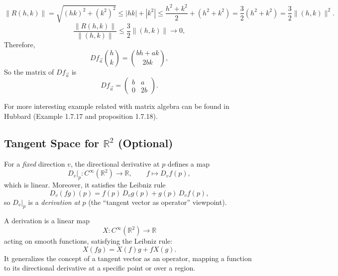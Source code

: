 \[
\|R(h,k)\|=\sqrt{(hk)^2+(k^2)^2}\le |hk|+|k^2|
\le \frac{h^2+k^2}{2}+(h^2+k^2)=\frac{3}{2}(h^2+k^2)=\frac{3}{2}\|(h,k)\|^2.
\]
\[
\frac{\|R(h,k)\|}{\|(h,k)\|}\le \frac{3}{2}\|(h,k)\|\to 0,
\]
Therefore,
\[
Df_{\vec a}\binom{h}{k}=\binom{bh+ak}{2bk},
\]
So the matrix of $Df_{\vec a}$ is
\[
Df_{\vec a}=
\begin{pmatrix}
b & a\\
0 & 2b
\end{pmatrix}.
\]
\begin{remark}
  For more interesting example related with matrix algebra can be found in Hubbard \cite{hubbard} (Example 1.7.17 and proposition 1.7.18).
\end{remark}

\subsection{Tangent Space for $\mathbb R^2$ (Optional)}
For a \emph{fixed} direction $v$, the directional derivative at $p$ defines a map
\[
D_v\big|_p: C^\infty(\mathbb{R}^2)\longrightarrow \mathbb{R},
\qquad
f\longmapsto D_v f(p),
\]
which is linear. Moreover, it satisfies the Leibniz rule
\[
D_v(fg)(p)=f(p)\,D_v g(p)+g(p)\,D_v f(p),
\]
so $D_v|_p$ is a \emph{derivation at $p$} (the ``tangent vector as operator'' viewpoint).

\begin{definition}
A derivation is a linear map
\[
X : C^\infty(\mathbb R^2) \to \mathbb{R}
\]
acting on smooth functions, satisfying the
Leibniz rule:
\[
X(fg) = X(f)g + fX(g).
\]
It generalizes the concept of a tangent vector as an operator, mapping a
function to its directional derivative at a specific point or over a region.
\end{definition}

